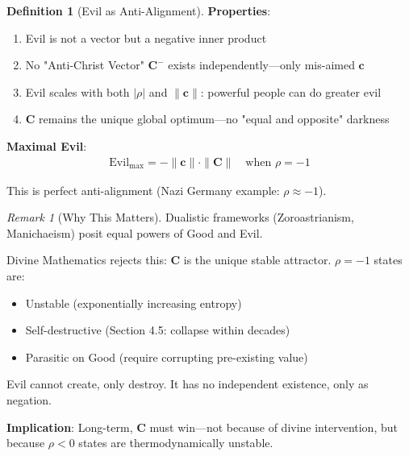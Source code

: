 \documentclass[11pt,a4paper]{article}
\theoremstyle{definition}
\newtheorem{definition}{Definition}[section]
\theoremstyle{remark}
\newtheorem{remark}{Remark}[section]
\newcommand{\cc}{\mathbf{c}}
\begin{document}
\begin{small}
\begin{enumerate}
\begin{definition}[Evil as Anti-Alignment]
\textbf{Properties}:
\begin{enumerate}
    \item Evil is not a vector but a negative inner product
    \item No "Anti-Christ Vector" \(\mathbf{C}^-\) exists independently—only mis-aimed \(\cc\)
    \item Evil scales with both \(|\rho|\) and \(\|\cc\|\): powerful people can do greater evil
    \item \(\mathbf{C}\) remains the unique global optimum—no "equal and opposite" darkness
\end{enumerate}

\textbf{Maximal Evil}:
\begin{align}
\text{Evil}_{\max} = -\|\cc\| \cdot \|\mathbf{C}\| \quad \text{when } \rho = -1
\end{align}

This is perfect anti-alignment (Nazi Germany example: \(\rho \approx -1\)).
\end{definition}

\begin{remark}[Why This Matters]
Dualistic frameworks (Zoroastrianism, Manichaeism) posit equal powers of Good and Evil.

Divine Mathematics rejects this: \(\mathbf{C}\) is the unique stable attractor. \(\rho = -1\) states are:
\begin{itemize}
    \item Unstable (exponentially increasing entropy)
    \item Self-destructive (Section 4.5: collapse within decades)
    \item Parasitic on Good (require corrupting pre-existing value)
\end{itemize}

Evil cannot create, only destroy. It has no independent existence, only as negation.

\textbf{Implication}: Long-term, \(\mathbf{C}\) must win—not because of divine intervention, but because \(\rho < 0\) states are thermodynamically unstable.
\end{remark}

\begin{figure}[H]
\centering
{}
\end{figure}
\end{enumerate}
\end{small}
\end{document}
